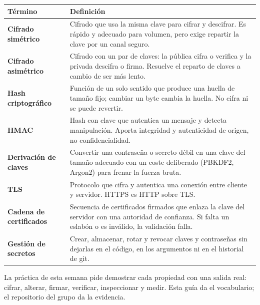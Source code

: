 \documentclass[11pt,a4paper]{article}
\begin{document}
\small
\begin{longtable}{@{}>{\raggedright\arraybackslash}p{4.2cm}>{\raggedright\arraybackslash}p{\dimexpr\linewidth-4.2cm-12pt\relax}@{}}
\toprule
\textbf{Término} & \textbf{Definición}\\
\midrule
\endhead
\bottomrule
\endlastfoot
\textbf{Cifrado simétrico} & Cifrado que usa la misma clave para cifrar y descifrar. Es rápido y adecuado para volumen, pero exige repartir la clave por un canal seguro.\\
\textbf{Cifrado asimétrico} & Cifrado con un par de claves: la pública cifra o verifica y la privada descifra o firma. Resuelve el reparto de claves a cambio de ser más lento.\\
\textbf{Hash criptográfico} & Función de un solo sentido que produce una huella de tamaño fijo; cambiar un byte cambia la huella. No cifra ni se puede revertir.\\
\textbf{HMAC} & Hash con clave que autentica un mensaje y detecta manipulación. Aporta integridad y autenticidad de origen, no confidencialidad.\\
\textbf{Derivación de claves} & Convertir una contraseña o secreto débil en una clave del tamaño adecuado con un coste deliberado (PBKDF2, Argon2) para frenar la fuerza bruta.\\
\textbf{TLS} & Protocolo que cifra y autentica una conexión entre cliente y servidor. HTTPS es HTTP sobre TLS.\\
\textbf{Cadena de certificados} & Secuencia de certificados firmados que enlaza la clave del servidor con una autoridad de confianza. Si falta un eslabón o es inválido, la validación falla.\\
\textbf{Gestión de secretos} & Crear, almacenar, rotar y revocar claves y contraseñas sin dejarlas en el código, en los argumentos ni en el historial de git.\\
\end{longtable}

\begin{cajaRecuerda}La práctica de esta semana pide demostrar cada propiedad con una salida real: cifrar, alterar, firmar, verificar, inspeccionar y medir. Esta guía da el vocabulario; el repositorio del grupo da la evidencia.
\end{cajaRecuerda}
\end{document}
